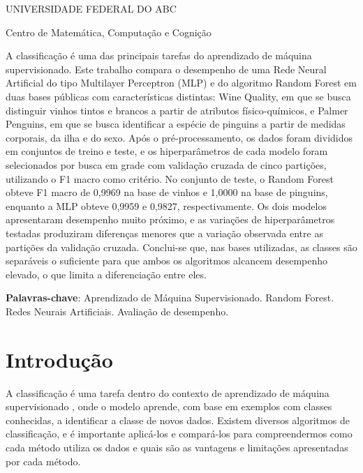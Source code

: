 \documentclass[12pt, oneside, a4paper, english, brazilian]{abntex2}
\renewcommand{\imprimircapa}{%
  \begin{capa}%
    \center
    {\ABNTEXchapterfont\large UNIVERSIDADE FEDERAL DO ABC\par
    Centro de Matemática, Computação e Cognição\par}
    \vspace*{1.5cm}
    {\ABNTEXchapterfont\large\imprimirautor}
    \vfill
    \begin{center}
      \ABNTEXchapterfont\bfseries\LARGE\imprimirtitulo
    \end{center}
    \vfill
    {\ABNTEXchapterfont\large\imprimirlocal\par
    \imprimirdata\par}
    \vspace*{1cm}
  \end{capa}
}
\begin{document}
\pretextual

\imprimircapa
\imprimirfolhaderosto

\begin{resumo}
A classificação é uma das principais tarefas do aprendizado de máquina supervisionado. Este trabalho compara o desempenho de uma Rede Neural Artificial do tipo Multilayer Perceptron (MLP) e do algoritmo Random Forest em duas bases públicas com características distintas: Wine Quality, em que se busca distinguir vinhos tintos e brancos a partir de atributos físico-químicos, e Palmer Penguins, em que se busca identificar a espécie de pinguins a partir de medidas corporais, da ilha e do sexo. Após o pré-processamento, os dados foram divididos em conjuntos de treino e teste, e os hiperparâmetros de cada modelo foram selecionados por busca em grade com validação cruzada de cinco partições, utilizando o F1 macro como critério. No conjunto de teste, o Random Forest obteve F1 macro de 0,9969 na base de vinhos e 1,0000 na base de pinguins, enquanto a MLP obteve 0,9959 e 0,9827, respectivamente. Os dois modelos apresentaram desempenho muito próximo, e as variações de hiperparâmetros testadas produziram diferenças menores que a variação observada entre as partições da validação cruzada. Conclui-se que, nas bases utilizadas, as classes são separáveis o suficiente para que ambos os algoritmos alcancem desempenho elevado, o que limita a diferenciação entre eles.

\textbf{Palavras-chave}: Aprendizado de Máquina Supervisionado. Random Forest. Redes Neurais Artificiais. Avaliação de desempenho.  
\end{resumo}

\listoffigures*
\cleardoublepage

\listoftables*
\cleardoublepage

\tableofcontents*
\cleardoublepage

\textual

\chapter{Introdução}

A classificação é uma tarefa dentro do contexto de aprendizado de máquina supervisionado \cite{faceli2021inteligencia}, onde o modelo aprende, com base em exemplos com classes conhecidas, a identificar a classe de novos dados. Existem diversos algoritmos de classificação, e é importante aplicá-los e compará-los para compreendermos como cada método utiliza os dados e quais são as vantagens e limitações apresentadas por cada método.
\end{document}
